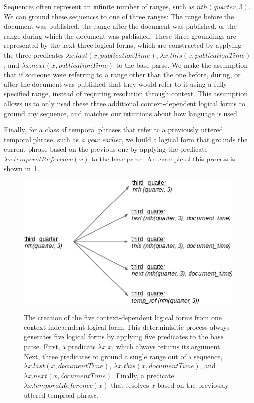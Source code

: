 Sequences often represent an infinite number of ranges, such as $nth(quarter,3)$. We can ground these sequences to one of three ranges: The range before the document was published, the range after the document was published, or the range during which the document was published. These three groundings are represented by the next three logical forms, which are constructed by applying the three predicates $\lambda x.last(x, publicationTime)$, $\lambda x.this(x, publicationTime)$, and $\lambda x.next(x, publicationTime)$ to the base parse. We make the assumption that if someone were referring to a range other than the one before, during, or after the document was published that they would refer to it using a fully-specified range, instead of requiring resolution through context. This assumption allows us to only need these three additional context-dependent logical forms to ground any sequence, and matches our intuitions about how language is used. 

Finally, for a class of temporal phrases that refer to a previously uttered temporal phrase, such as \emph{a year earlier}, we build a logical form that grounds the current phrase based on the previous one by applying the predicate $\lambda x.temporalReference(x)$ to the base parse. An example of this process is shown in~\ref{fig:contextIndependentLogicalForms}.
\begin{figure}[b]
   \center
   {\includegraphics[width=1.2\columnwidth]{fig/context-independentLogicalForms.jpg}}
   \caption{The creation of the five context-dependent logical forms from one context-independent logical form. This determinisitic process always generates five logical forms by applying five predicates to the base parse. First, a predicate $\lambda x.x$, which always returns its argument. Next, three predicates to ground a single range out of a sequence, $\lambda x.last(x, documentTime)$, $\lambda x.this(x, documentTime)$, and $\lambda x.next(x, documentTime)$. Finally, a predicate $\lambda x.temporalReference(x)$ that resolves $x$ based on the previously uttered temproal phrase.
   } 
   \label{fig:contextIndependentLogicalForms}
\end{figure}

